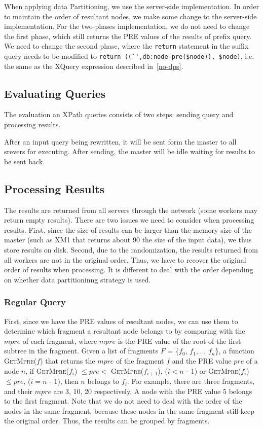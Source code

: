 When applying data Partitioning, we use the server-side implementation. In
order to maintain the order of resultant nodes, we make some change to the
server-side implementation. For the two-phases implementation, we do not need to
change the first phase, which still returns the PRE values of the results of
prefix query. We need to change the second phase, where the \verb|return|
statement in the suffix query needs to be modified to 
\verb|return ((`',db:node-pre($node)), $node)|, 
i.e. the same as the XQuery expression described in~\ref{no-dps}.



\subsection{Evaluating Queries}

The evaluation an XPath queries consists of two steps: sending query and
processing results. 

After an input query being rewritten, it will be sent form the master to all
srevers for executing. After sending, the master will be idle waiting for
results to be sent back.

\subsection{Processing Results}

The results are returned from all servers through the network (some workers may
return empty results). There are two issues we need to consider when processing
results. First, since the size of results can be larger than the memory size of
the master (such as XM1 that returns about 90 the size of the input data), we
thus store results on disk. Second, due to the randomization, the results
returned from all workers are not in the original order. Thus, we have to
recover the original order of results when processing. It is different to deal
with the order depending on whether data partitioninng strategy is used.

\subsubsection{Regular Query}

First, since we have the PRE values of resultant nodes, we can use them to
determine which fragment a resultant node belongs to by comparing with the
$mpre$ of each fragment, where $mpre$ is the PRE value of the root of the first
subtree in the fragment. Given a list of fragments $F$ = \{$f_0$, $f_1$,...,
$f_n$\}, a function \textsc{GetMpre($f$)} that returns the $mpre$ of the
fragment $f$ and the PRE value $pre$ of a node $n$, if \textsc{GetMpre($f_i$)}
$\leq pre <$ \textsc{GetMpre($f_{i+1}$)}, ($i  < n$ - 1) or
\textsc{GetMpre($f_i$)}$\leq pre$, ($i = n$ - 1), then $n$ belongs to $f_i$. For
example, there are three fragments, and their $mpre$ are 3, 10, 20 respectively.
A node with the PRE value 5 belongs to the first fragment. Note that we do not
need to deal with the order of the nodes in the same fragment, because these
nodes in the same fragment still keep the original order. Thus, the results can
be grouped by fragments.

